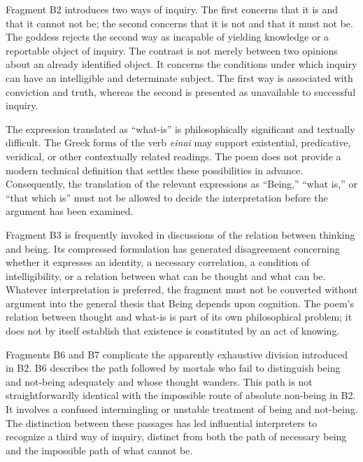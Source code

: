 
Fragment B2 introduces two ways of inquiry. The first concerns
that it is and that it cannot not be; the second concerns that
it is not and that it must not be. The goddess rejects the
second way as incapable of yielding knowledge or a reportable
object of inquiry. The contrast is not merely between two
opinions about an already identified object. It concerns
the conditions under which inquiry can have an intelligible
and determinate subject. The first way is associated with
conviction and truth, whereas the second is presented as
unavailable to successful inquiry.


The expression translated as ``what-is'' is philosophically
significant and textually difficult. The Greek forms of the
verb \textit{einai} may support existential, predicative,
veridical, or other contextually related readings. The poem
does not provide a modern technical definition that settles
these possibilities in advance. Consequently, the translation
of the relevant expressions as ``Being,'' ``what is,'' or
``that which is'' must not be allowed to decide the
interpretation before the argument has been examined.


Fragment B3 is frequently invoked in discussions of the relation
between thinking and being. Its compressed formulation has
generated disagreement concerning whether it expresses an
identity, a necessary correlation, a condition of intelligibility,
or a relation between what can be thought and what can be.
Whatever interpretation is preferred, the fragment must not
be converted without argument into the general thesis that
Being depends upon cognition. The poem's relation between
thought and what-is is part of its own philosophical problem;
it does not by itself establish that existence is constituted
by an act of knowing.


Fragments B6 and B7 complicate the apparently exhaustive
division introduced in B2. B6 describes the path followed
by mortals who fail to distinguish being and not-being
adequately and whose thought wanders. This path is not
straightforwardly identical with the impossible route
of absolute non-being in B2. It involves a confused
intermingling or unstable treatment of being and not-being.
The distinction between these passages has led influential
interpreters to recognize a third way of inquiry, distinct
from both the path of necessary being and the impossible
path of what cannot be.

